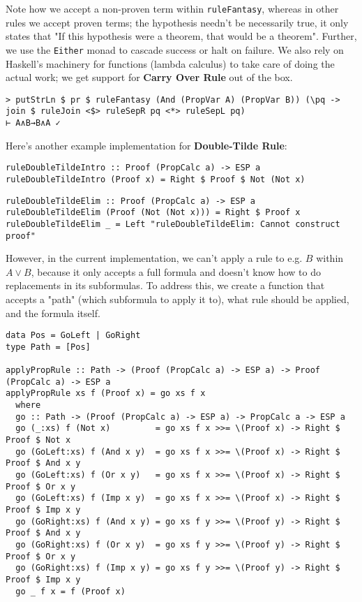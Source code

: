 \documentclass{article}
\begin{document}
Note how we accept a non-proven term within \texttt{ruleFantasy}, whereas in other rules we accept proven terms; the hypothesis needn't be necessarily true, it only states that "If this hypothesis were a theorem, that would be a theorem". Further, we use the \texttt{Either} monad to cascade success or halt on failure. We also rely on Haskell's machinery for functions (lambda calculus) to take care of doing the actual work; we get support for \textbf{Carry Over Rule} out of the box.

\begin{lstlisting}
> putStrLn $ pr $ ruleFantasy (And (PropVar A) (PropVar B)) (\pq -> join $ ruleJoin <$> ruleSepR pq <*> ruleSepL pq)
⊢ A∧B→B∧A ✓
\end{lstlisting}

Here's another example implementation for \textbf{Double-Tilde Rule}:

\begin{minipage}{0.45\textwidth}
\begin{lstlisting}
ruleDoubleTildeIntro :: Proof (PropCalc a) -> ESP a
ruleDoubleTildeIntro (Proof x) = Right $ Proof $ Not (Not x)
\end{lstlisting}
\end{minipage}
\begin{minipage}{0.53\textwidth}
\begin{lstlisting}
ruleDoubleTildeElim :: Proof (PropCalc a) -> ESP a
ruleDoubleTildeElim (Proof (Not (Not x))) = Right $ Proof x
ruleDoubleTildeElim _ = Left "ruleDoubleTildeElim: Cannot construct proof"
\end{lstlisting}
\end{minipage}

However, in the current implementation, we can't apply a rule to e.g. $B$ within $A \lor B$, because it only accepts a full formula and doesn't know how to do replacements in its subformulas. To address this, we create a function that accepts a "path" (which subformula to apply it to), what rule should be applied, and the formula itself.

\begin{lstlisting}
data Pos = GoLeft | GoRight
type Path = [Pos]

applyPropRule :: Path -> (Proof (PropCalc a) -> ESP a) -> Proof (PropCalc a) -> ESP a
applyPropRule xs f (Proof x) = go xs f x
  where
  go :: Path -> (Proof (PropCalc a) -> ESP a) -> PropCalc a -> ESP a
  go (_:xs) f (Not x)         = go xs f x >>= \(Proof x) -> Right $ Proof $ Not x
  go (GoLeft:xs) f (And x y)  = go xs f x >>= \(Proof x) -> Right $ Proof $ And x y
  go (GoLeft:xs) f (Or x y)   = go xs f x >>= \(Proof x) -> Right $ Proof $ Or x y
  go (GoLeft:xs) f (Imp x y)  = go xs f x >>= \(Proof x) -> Right $ Proof $ Imp x y
  go (GoRight:xs) f (And x y) = go xs f y >>= \(Proof y) -> Right $ Proof $ And x y
  go (GoRight:xs) f (Or x y)  = go xs f y >>= \(Proof y) -> Right $ Proof $ Or x y
  go (GoRight:xs) f (Imp x y) = go xs f y >>= \(Proof y) -> Right $ Proof $ Imp x y
  go _ f x = f (Proof x)
\end{lstlisting}
\end{document}
